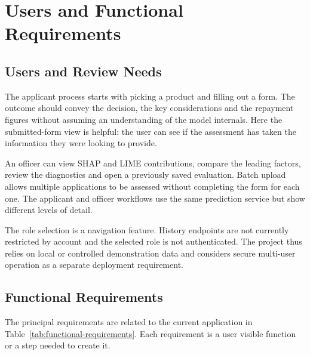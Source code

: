 \section{Users and Functional Requirements}
\subsection{Users and Review Needs}
The applicant process starts with picking a product and filling out a form. The outcome should convey the decision, the key considerations and the repayment figures without assuming an understanding of the model internals. Here the submitted-form view is helpful: the user can see if the assessment has taken the information they were looking to provide.

An officer can view SHAP and LIME contributions, compare the leading factors, review the diagnostics and open a previously saved evaluation. Batch upload allows multiple applications to be assessed without completing the form for each one. The applicant and officer workflows use the same prediction service but show different levels of detail.

The role selection is a navigation feature. History endpoints are not currently restricted by account and the selected role is not authenticated. The project thus relies on local or controlled demonstration data and considers secure multi-user operation as a separate deployment requirement.

\subsection{Functional Requirements}
The principal requirements are related to the current application in Table~\ref{tab:functional-requirements}. Each requirement is a user visible function or a step needed to create it.

